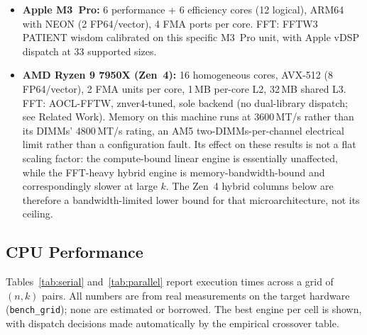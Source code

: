 \documentclass[11pt]{article}
\begin{document}
\begin{itemize}
  \item \textbf{Apple M3~Pro:} 6 performance + 6 efficiency cores (12
    logical), ARM64 with NEON (2 FP64/vector), 4 FMA ports per core.
    FFT: FFTW3 PATIENT wisdom calibrated on this specific M3~Pro unit,
    with Apple vDSP dispatch at 33 supported sizes.
  \item \textbf{AMD Ryzen 9 7950X (Zen~4):} 16 homogeneous cores,
    AVX-512 (8 FP64/vector), 2 FMA units per core, 1\,MB per-core L2,
    32\,MB shared L3. FFT: AOCL-FFTW, znver4-tuned, sole backend (no
    dual-library dispatch; see Related Work). Memory on this machine runs
    at 3600\,MT/s rather than its DIMMs' 4800\,MT/s rating, an AM5
    two-DIMMs-per-channel electrical limit rather than a configuration
    fault. Its effect on these results is not a flat scaling factor: the
    compute-bound linear engine is essentially unaffected, while the
    FFT-heavy hybrid engine is memory-bandwidth-bound and correspondingly
    slower at large $k$. The Zen~4 hybrid columns below are therefore a
    bandwidth-limited lower bound for that microarchitecture, not its
    ceiling.
\end{itemize}

\subsection{CPU Performance}

Tables~\ref{tab:serial} and~\ref{tab:parallel} report execution times
across a grid of $(n, k)$ pairs. All numbers are from real measurements on
the target hardware (\texttt{bench\_grid}); none are estimated or
borrowed. The best engine per cell is shown, with
dispatch decisions made automatically by the empirical crossover table.
\end{document}
